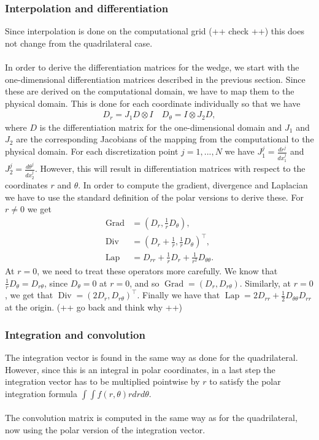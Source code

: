 \documentclass[11pt, a4paper]{article}
\theoremstyle{definition}
\DeclareMathOperator{\Grad}{Grad}
\DeclareMathOperator{\Div}{Div}
\DeclareMathOperator{\Lap}{Lap}
\begin{document}
\subsubsection{Interpolation and differentiation}
Since interpolation is done on the computational grid (++ check ++) this does not change from the quadrilateral case.
\\
\\
In order to derive the differentiation matrices for the wedge, we start with the one-dimensional differentiation matrices described in the previous section. Since these are derived on the computational domain, we have to map them to the physical domain. This is done for each coordinate individually so that we have
\begin{align*}
	D_r = J_1D \otimes I \quad 	D_\theta =I \otimes J_2D,
\end{align*} 
where $D$ is the differentiation matrix for the one-dimensional domain and $J_1$ and $J_2$  are the corresponding Jacobians of the mapping from the computational to the physical domain. For each discretization point $j = 1,...,N$ we have $ J_1^j= \frac{dr^j}{dx_1^j}$ and $J_2^j = \frac{d\theta^j}{dx_2^j}$.
However, this will result in differentiation matrices with respect to the coordinates $r$ and $\theta$. In order to compute the gradient, divergence and Laplacian we have to use the standard definition of the polar versions to derive these. For $ r \neq 0$ we get
\begin{align*}
	\Grad  &= \left(D_r, \frac{1}{r} D_\theta\right) ,\\
	\Div &= \left(D_r + \frac{1}{r}, \frac{1}{r} D_\theta\right)^\top ,\\
	\Lap  &= D_{rr} +\frac{1}{r}D_r +  \frac{1}{r^2} D_{\theta \theta}.
\end{align*}
At $ r = 0$, we need to treat these operators more carefully. We know that $\frac{1}{r} D_\theta = D_{r\theta}$, since $D_\theta =0$ at $r = 0$, and so $ \Grad = \left(D_r, D_{r\theta}\right)$. Similarly, at $r = 0$, we get that $\Div = \left(2D_r, D_{r\theta}\right)^\top$. Finally we have that $\Lap = 2 D_{rr} + \frac{1}{2} D_{\theta\theta}D_{rr}$ at the origin. (++ go back and think why ++)


\subsubsection{Integration and convolution}
The integration vector is found in the same way as done for the quadrilateral. However, since this is an integral in polar coordinates, in a last step the integration vector has to be multiplied pointwise by $r$ to satisfy the polar integration formula $\int \int f(r, \theta) r dr d\theta$.
\\
\\
The convolution matrix is computed in the same way as for the quadrilateral, now using the polar version of the integration vector.
\end{document}
